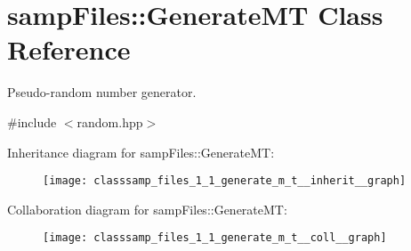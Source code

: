 \hypertarget{classsamp_files_1_1_generate_m_t}{}\section{samp\+Files\+:\+:Generate\+MT Class Reference}
\label{classsamp_files_1_1_generate_m_t}


Pseudo-\/random number generator.  




{\ttfamily \#include $<$random.\+hpp$>$}



Inheritance diagram for samp\+Files\+:\+:Generate\+MT\+:\nopagebreak
\begin{figure}[H]
\begin{center}
\leavevmode
\texttt{[image: classsamp\_files\_1\_1\_generate\_m\_t\_\_inherit\_\_graph]}
\end{center}
\end{figure}


Collaboration diagram for samp\+Files\+:\+:Generate\+MT\+:\nopagebreak
\begin{figure}[H]
\begin{center}
\leavevmode
\texttt{[image: classsamp\_files\_1\_1\_generate\_m\_t\_\_coll\_\_graph]}
\end{center}
\end{figure}
